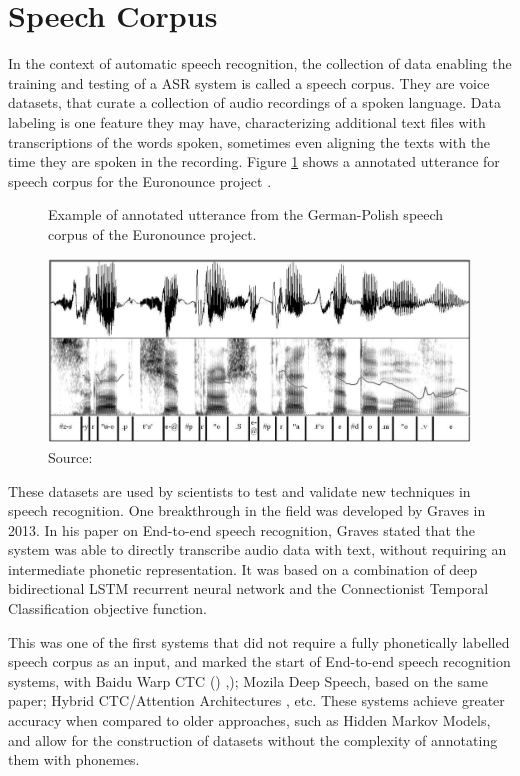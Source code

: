 \section{Speech Corpus}

In the context of automatic speech recognition, the collection of data enabling the training and testing of a ASR system is called a speech corpus. They are voice datasets, that curate a collection of audio recordings of a spoken language. Data labeling is one feature they may have, characterizing additional text files with transcriptions of the words spoken, sometimes even aligning the texts with the time they are spoken in the recording. Figure \ref{fig:annotated-speech-corpus} shows a annotated utterance for speech corpus for the Euronounce project \cite{demenko2009applying}.

\begin{figure}[h]
    \centering
    \caption{Example of annotated utterance from the German-Polish speech corpus of the Euronounce project.}
    \includegraphics[width=0.8\linewidth]{images/background/annotated-speech-corpus.png}
    \caption*{Source: \cite{demenko2009applying}}
    \label{fig:annotated-speech-corpus}
\end{figure}

These datasets are used by scientists to test and validate new techniques in speech recognition. One breakthrough in the field was developed by Graves \cite{graves2013speech} in 2013. In his paper on End-to-end speech recognition, Graves stated that the system was able to directly transcribe audio data with text, without requiring an intermediate phonetic representation. It was based on a combination of deep bidirectional LSTM recurrent neural network and the Connectionist Temporal Classification objective function. 

This was one of the first systems that did not require a fully phonetically labelled speech corpus as an input, and marked the start of End-to-end speech recognition systems, with Baidu Warp CTC (\cite{hannun2014deep}) ,\cite{collobert2016wav2letter}); Mozila Deep Speech, based on the same paper; Hybrid CTC/Attention Architectures \cite{8068205}, etc. These systems achieve greater accuracy when compared to older approaches, such as Hidden Markov Models, and allow for the construction of datasets without the complexity of annotating them with phonemes.


